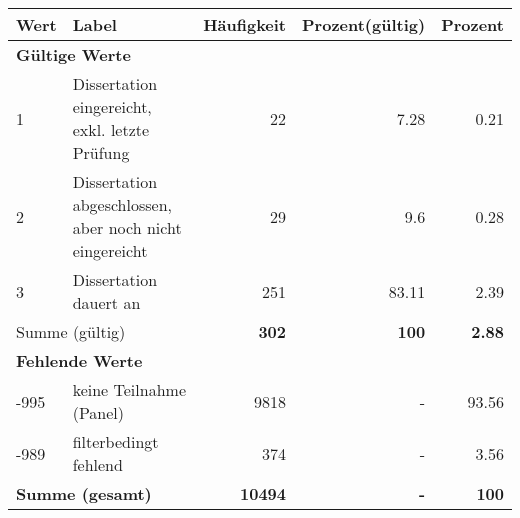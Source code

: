      \begin{longtable}{lXrrr}
     \toprule
     \textbf{Wert} & \textbf{Label} & \textbf{Häufigkeit} & \textbf{Prozent(gültig)} & \textbf{Prozent} \\
     \endhead
     \midrule
     \multicolumn{5}{l}{\textbf{Gültige Werte}}\\

     1 &
     \multicolumn{1}{X}{ Dissertation eingereicht, exkl. letzte Prüfung   } &


       \num{22} &
       \num[round-mode=places,round-precision=2]{7,28} &
         \num[round-mode=places,round-precision=2]{0,21} \\

     2 &
     \multicolumn{1}{X}{ Dissertation abgeschlossen, aber noch nicht eingereicht   } &


       \num{29} &
       \num[round-mode=places,round-precision=2]{9,6} &
         \num[round-mode=places,round-precision=2]{0,28} \\

     3 &
     \multicolumn{1}{X}{ Dissertation dauert an   } &


       \num{251} &
       \num[round-mode=places,round-precision=2]{83,11} &
         \num[round-mode=places,round-precision=2]{2,39} \\
     \midrule
     \multicolumn{2}{l}{Summe (gültig)} &
       \textbf{\num{302}} &
     \textbf{100} &
       \textbf{\num[round-mode=places,round-precision=2]{2,88}} \\
     \multicolumn{5}{l}{\textbf{Fehlende Werte}}\\
       -995 &
       keine Teilnahme (Panel) &
         \num{9818} &
        - &
         \num[round-mode=places,round-precision=2]{93,56} \\
       -989 &
       filterbedingt fehlend &
         \num{374} &
        - &
         \num[round-mode=places,round-precision=2]{3,56} \\
     \midrule
     \multicolumn{2}{l}{\textbf{Summe (gesamt)}} &
          \textbf{\num{10494}} &
        \textbf{-} &
        \textbf{100} \\
     \bottomrule
     \end{longtable}
     
